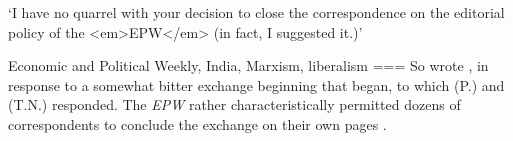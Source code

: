 ‘I have no quarrel with your decision to close the correspondence on the editorial policy of the <em>EPW</em> (in fact, I suggested it.)’

Economic and Political Weekly, India, Marxism, liberalism
===
So wrote \textcite{kumar1991a}, in response to a somewhat bitter exchange beginning that \textcite{kumar1991} began, to which (P.) \textcite{radhakrishnan1991} and (T.N.) \textcite{srinivasan1991} responded. The \emph{EPW} rather characteristically permitted dozens of correspondents to conclude the exchange on their own pages \parencite{chandra1991}.